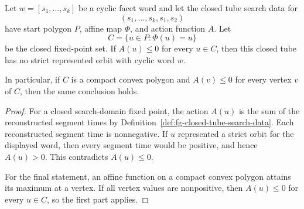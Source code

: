 \begin{unverified}
\begin{lemma}%
\label{lem:fg-nonpositive-fixed-set-no-strict-orbit}
Let \(w=[s_1,\ldots,s_k]\) be a cyclic facet word and let the closed tube
search data for
\[
  (s_1,\ldots,s_k,s_1,s_2)
\]
have start polygon \(P\), affine map \(\Phi\), and action function \(A\).  Let
\[
  C=\{u\in P:\Phi(u)=u\}
\]
be the closed fixed-point set.  If \(A(u)\le0\) for every \(u\in C\), then
this closed tube has no strict represented orbit with cyclic word \(w\).

In particular, if \(C\) is a compact convex polygon and \(A(v)\le0\) for every
vertex \(v\) of \(C\), then the same conclusion holds.
\end{lemma}

\begin{proof}
For a closed search-domain fixed point, the action \(A(u)\) is the sum of the
reconstructed segment times by
Definition~\ref{def:fg-closed-tube-search-data}.  Each reconstructed segment
time is nonnegative.  If \(u\) represented a strict orbit for the displayed
word, then every segment time would be positive, and hence \(A(u)>0\).  This
contradicts \(A(u)\le0\).

For the final statement, an affine function on a compact convex polygon attains
its maximum at a vertex.  If all vertex values are nonpositive, then
\(A(u)\le0\) for every \(u\in C\), so the first part applies.
\end{proof}
\end{unverified}

